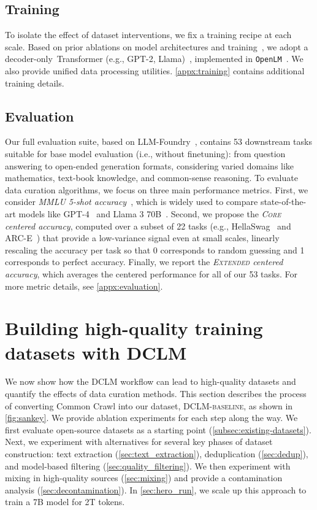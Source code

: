 \subsection{Training}
\label{sec:training}
To isolate the effect of dataset interventions, we fix a training recipe at each scale. Based on prior ablations on model architectures and training~\citep{Radford2019LanguageMA,wortsman2023small,gadre2024LanguageMS,scao2022language,chinchilla,gpt3,Chowdhery2022PaLMSL,llama,llama2,llama3}, we adopt a decoder-only~Transformer (e.g., GPT-2, Llama)~\citep{transformer,llama,Radford2019LanguageMA}, implemented in \texttt{OpenLM}~\citep{open_lm}.
We also provide unified data processing utilities.
\ref{appx:training} contains additional training details.

\subsection{Evaluation}
\label{sec:evaluation}
Our full evaluation suite, based on LLM-Foundry~\citep{mosaicml}, contains 53 downstream tasks suitable for base model evaluation (i.e., without finetuning): from question answering to open-ended generation formats, considering varied domains like mathematics, text-book knowledge, and common-sense reasoning. To evaluate data curation algorithms, we focus on three main performance metrics. First, we consider \emph{MMLU 5-shot accuracy}~\citep{mmlu}, which is widely used to compare state-of-the-art models like GPT-4~\citep{gpt4} and Llama 3 70B~\citep{llama3}. Second, we propose the \emph{\textsc{Core} centered accuracy}, computed over a subset of 22 tasks (e.g., HellaSwag~\citep{hellaswag} and ARC-E~\citep{arc}) that provide a low-variance signal even at small scales, linearly rescaling the accuracy per task so that 0 corresponds to random guessing and 1 corresponds to perfect accuracy. Finally, we report the \emph{\textsc{Extended} centered accuracy}, which averages the centered performance for all of our 53 tasks. For more metric details, see \ref{appx:evaluation}.

\section{Building high-quality training datasets with \textsc{DCLM}}
\label{sec:results}
We now show how the \textsc{DCLM} workflow can lead to high-quality datasets and quantify the effects of data curation methods. This section describes the process of converting Common Crawl into our dataset, \textsc{DCLM-baseline}, as shown in \ref{fig:sankey}. We provide ablation experiments for each step along the way. We first evaluate open-source datasets as a starting point (\ref{subsec:existing-datasets}).
Next, we experiment with alternatives for several key phases of dataset construction: text extraction (\ref{sec:text_extraction}),
deduplication (\ref{sec:dedup}), and model-based filtering (\ref{sec:quality_filtering}). We then experiment with mixing in high-quality sources (\ref{sec:mixing}) and provide a contamination analysis (\ref{sec:decontamination}). In \ref{sec:hero_run}, we scale up this approach to train a 7B model for 2T tokens.

